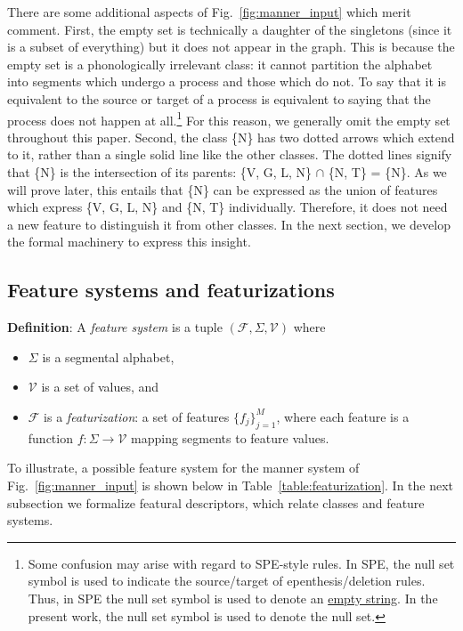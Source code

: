 \documentclass[11pt, oneside]{article}   	%
\begin{document}
There are some additional aspects of Fig.~\ref{fig:manner_input} which merit comment. First, the empty set is technically a daughter of the singletons (since it is a subset of everything) but it does not appear in the graph. This is because the empty set is a phonologically irrelevant class: it cannot partition the alphabet into segments which undergo a process and those which do not. To say that it is equivalent to the source or target of a process is equivalent to saying that the process does not happen at all.\footnote{Some confusion may arise with regard to SPE-style rules. In SPE, the null set symbol is used to indicate the source/target of epenthesis/deletion rules. Thus, in SPE the null set symbol is used to denote an \underline{empty string}. In the present work, the null set symbol is used to denote the null set.} For this reason, we generally omit the empty set throughout this paper. Second, the class \{N\} has two dotted arrows which extend to it, rather than a single solid line like the other classes. The dotted lines signify that \{N\} is the intersection of its parents: \{V, G, L, N\} $\cap$ \{N, T\} = \{N\}. As we will prove later, this entails that \{N\} can be expressed as the union of features which express \{V, G, L, N\} and \{N, T\} individually. Therefore, it does not need a new feature to distinguish it from other classes. In the next section, we develop the formal machinery to express this insight.

\subsection{Feature systems and featurizations}

\textbf{Definition}: A \textit{feature system} is a tuple $(\mathcal F, \Sigma, \mathcal V)$ where
\begin{itemize}
    \item $\Sigma$ is a segmental alphabet, 
    \item $\mathcal V$ is a set of values, and 
    \item $\mathcal F$ is a \textit{featurization}: a set of features $\{f_j\}_{j=1}^M$, where each feature is a function $f: \Sigma \rightarrow \mathcal V$ mapping segments to feature values.
\end{itemize}

\noindent To illustrate, a possible feature system for the manner system of Fig.~\ref{fig:manner_input} is shown below in Table~\ref{table:featurization}. In the next subsection we formalize featural descriptors, which relate classes and feature systems.
\end{document}
